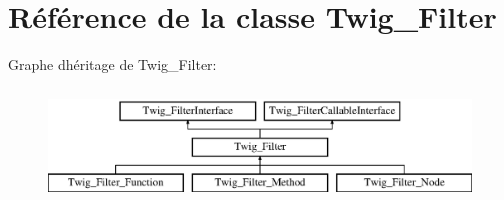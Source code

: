 \hypertarget{class_twig___filter}{}\section{Référence de la classe Twig\+\_\+\+Filter}
\label{class_twig___filter}
Graphe d\textquotesingle{}héritage de Twig\+\_\+\+Filter\+:\begin{figure}[H]
\begin{center}
\leavevmode
\includegraphics[height=3.000000cm]{class_twig___filter}
\end{center}
\end{figure}
